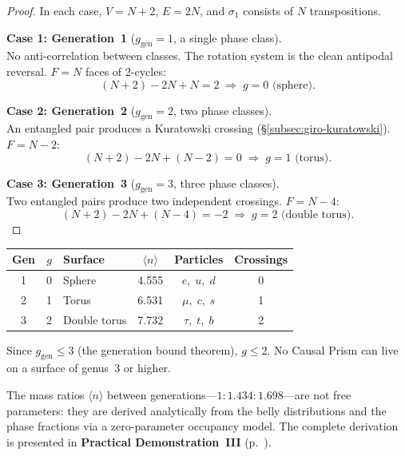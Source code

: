 \begin{proof}
In each case, $V = N + 2$, $E = 2N$, and $\sigma_1$ consists of $N$
transpositions.

\medskip\noindent
\textbf{Case 1: Generation~1} ($g_{\mathrm{gen}} = 1$, a single phase
class).\\
No anti-correlation between classes. The rotation system is the
clean antipodal reversal. $F = N$ faces of 2-cycles:
\[
  (N+2) - 2N + N = 2 \;\Longrightarrow\; g = 0 \text{ (sphere).}
\]

\medskip\noindent
\textbf{Case 2: Generation~2} ($g_{\mathrm{gen}} = 2$, two phase
classes).\\
An entangled pair produces a Kuratowski crossing
(\S\ref{subsec:giro-kuratowski}). $F = N - 2$:
\[
  (N+2) - 2N + (N-2) = 0 \;\Longrightarrow\; g = 1 \text{ (torus).}
\]

\medskip\noindent
\textbf{Case 3: Generation~3} ($g_{\mathrm{gen}} = 3$, three phase
classes).\\
Two entangled pairs produce two independent crossings. $F = N - 4$:
\[
  (N+2) - 2N + (N-4) = -2 \;\Longrightarrow\; g = 2
  \text{ (double torus).}
\]
\end{proof}

\medskip
\begin{center}
\renewcommand{\arraystretch}{1.2}
\begin{tabular}{cclccc}
\toprule
Gen & $g$ & Surface & $\langle n \rangle$ & Particles
  & Crossings \\
\midrule
1 & 0 & Sphere        & 4.555 & $e,\; u,\; d$ & 0 \\
2 & 1 & Torus         & 6.531 & $\mu,\; c,\; s$ & 1 \\
3 & 2 & Double torus  & 7.732 & $\tau,\; t,\; b$ & 2 \\
\bottomrule
\end{tabular}
\end{center}

\medskip
\noindent
Since $g_{\mathrm{gen}} \le 3$ (the generation bound theorem),
$g \le 2$. No Causal Prism can live on a surface of genus~3 or higher.

The mass ratios $\langle n \rangle$ between generations---$1 :
1{.}434 : 1{.}698$---are not free parameters: they are derived
analytically from the belly distributions and the phase fractions
via a zero-parameter occupancy model. The complete derivation
is presented in \textbf{Practical Demonstration~III}
(p.~\pageref{sec:demo-mass}).

